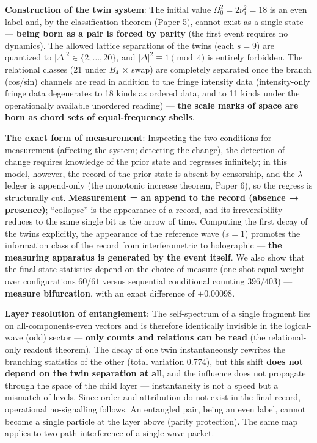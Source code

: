 \documentclass[
]{article}
\begin{document}
\textbf{Construction of the twin system}: The initial value
\(\Omega_0^2=2\nu_1^2=18\) is an even label and, by the classification
theorem (Paper 5), cannot exist as a single state --- \textbf{being born
as a pair is forced by parity} (the first event requires no dynamics).
The allowed lattice separations of the twins (each \(s=9\)) are
quantized to \(|\Delta|^2\in\{2,\ldots,20\}\), and
\(|\Delta|^2\equiv1\pmod4\) is entirely forbidden. The relational classes (21 under \(B_4\) × swap) are completely separated
once the branch (cos/sin) channels are read in addition to the fringe intensity data
(intensity-only fringe data degenerates to 18 kinds as ordered data, and to 11 kinds
under the operationally available unordered reading) --- \textbf{the
scale marks of space are born as chord sets of equal-frequency shells}.

\textbf{The exact form of measurement}: Inspecting the two conditions
for measurement (affecting the system; detecting the change), the
detection of change requires knowledge of the prior state and regresses
infinitely; in this model, however, the record of the prior state is
absent by censorship, and the \(\lambda\) ledger is append-only (the
monotonic increase theorem, Paper 6), so the regress is structurally
cut. \textbf{Measurement = an append to the record (absence →
presence)}; ``collapse'' is the appearance of a record, and its
irreversibility reduces to the same single bit as the arrow of time.
Computing the first decay of the twins explicitly, the appearance of the
reference wave (\(s=1\)) promotes the information class of the record
from interferometric to holographic --- \textbf{the measuring apparatus
is generated by the event itself}. We also show that the final-state
statistics depend on the choice of measure (one-shot equal weight over
configurations \(60/61\) versus sequential conditional counting
\(396/403\)) --- \textbf{measure bifurcation}, with an exact difference
of \(+0.00098\).

\textbf{Layer resolution of entanglement}: The self-spectrum of a single
fragment lies on all-components-even vectors and is therefore
identically invisible in the logical-wave (odd) sector --- \textbf{only
counts and relations can be read} (the relational-only readout theorem).
The decay of one twin instantaneously rewrites the branching statistics
of the other (total variation 0.774), but this shift \textbf{does not
depend on the twin separation at all}, and the influence does not
propagate through the space of the child layer --- instantaneity is not
a speed but a mismatch of levels. Since order and attribution do not
exist in the final record, operational no-signalling follows. An
entangled pair, being an even label, cannot become a single particle at
the layer above (parity protection). The same map applies to two-path
interference of a single wave packet.
\end{document}
